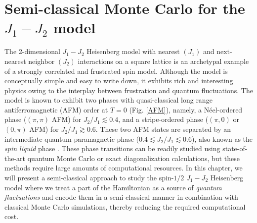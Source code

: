 \documentclass[../thesis_main.tex]{subfiles}
\begin{document}
\chapter{Semi-classical Monte Carlo for the $J_1 - J_2$ model}
The 2-dimensional $J_1 - J_2$ Heisenberg model with nearest $(J_1)$ and next-nearest neighbor $(J_2)$ interactions on a square lattice is an archetypal example of a strongly correlated and frustrated spin model. Although the model is conceptually simple and easy to write down, it exhibits rich and interesting physics owing to the interplay between frustration and quantum fluctuations. The model is known to exhibit two phases with quasi-classical long range antiferromagnetic (AFM) order at $T = 0$ (Fig. \ref{AFM}), namely, a Néel-ordered phase ($(\pi,\pi)$ AFM) for $J_2/J_1 \lesssim 0.4$, and a stripe-ordered phase ($(\pi, 0)$ or $(0, \pi)$ AFM) for $J_2/J_1 \gtrsim 0.6$. These two AFM states are separated by an intermediate quantum paramagnetic phase ($0.4 \lesssim J_2/J_1 \lesssim 0.6$), also known as the \textit{spin liquid} phase \cite{Li_2014}. These phase transitions can be readily studied using state-of-the-art quantum Monte Carlo or exact diagonalization calculations, but these methods require large amounts of computational resources. In this chapter, we will present a semi-classical approach to study the spin-$1/2$ $J_1-J_2$ Heisenberg model where we treat a part of the Hamiltonian as a source of \textit{quantum fluctuations} and encode them in a semi-classical manner in combination with classical Monte Carlo simulations, thereby reducing the required computational cost.
\end{document}
